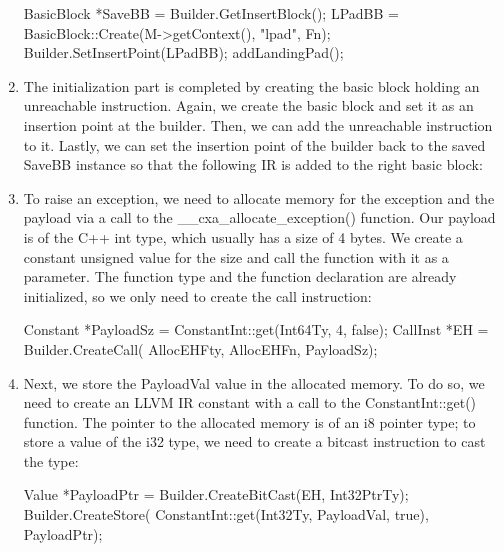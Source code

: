 \begin{enumerate}
\begin{cpp}
        BasicBlock *SaveBB = Builder.GetInsertBlock();
        LPadBB = BasicBlock::Create(M->getContext(),
                                    "lpad", Fn);
        Builder.SetInsertPoint(LPadBB);
        addLandingPad();
\end{cpp}

\item
The initialization part is completed by creating the basic block holding an unreachable instruction. Again, we create the basic block and set it as an insertion point at the builder. Then, we can add the unreachable instruction to it. Lastly, we can set the insertion point of the builder back to the saved SaveBB instance so that the following IR is added to the right basic block:

\begin{cpp}
        UnreachableBB = BasicBlock::Create(
        M->getContext(), "unreachable", Fn);
        Builder.SetInsertPoint(UnreachableBB);
        Builder.CreateUnreachable();
        Builder.SetInsertPoint(SaveBB);
    }
\end{cpp}

\item
To raise an exception, we need to allocate memory for the exception and the payload via a call to the \_\_cxa\_allocate\_exception() function. Our payload is of the C++ int type, which usually has a size of 4 bytes. We create a constant unsigned value for the size and call the function with it as a parameter. The function type and the function declaration are already initialized, so we only need to create the call instruction:

\begin{cpp}
    Constant *PayloadSz =
        ConstantInt::get(Int64Ty, 4, false);
    CallInst *EH = Builder.CreateCall(
        AllocEHFty, AllocEHFn, {PayloadSz});
\end{cpp}

\item
Next, we store the PayloadVal value in the allocated memory. To do so, we need to create an LLVM IR constant with a call to the ConstantInt::get() function. The pointer to the allocated memory is of an i8 pointer type; to store a value of the i32 type, we need to create a bitcast instruction to cast the type:

\begin{cpp}
    Value *PayloadPtr =
        Builder.CreateBitCast(EH, Int32PtrTy);
    Builder.CreateStore(
        ConstantInt::get(Int32Ty, PayloadVal, true),
        PayloadPtr);
\end{cpp}


\end{enumerate}
